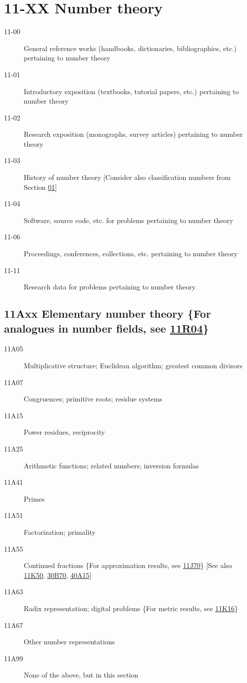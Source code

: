 \section*{11-XX Number theory }\label{11-XX}
\begin{description}
\item [11-00]\label{11-00} General reference works (handbooks, dictionaries, bibliographies, etc.) pertaining to number theory
\item [11-01]\label{11-01} Introductory exposition (textbooks, tutorial papers, etc.) pertaining to number theory
\item [11-02]\label{11-02} Research exposition (monographs, survey articles) pertaining to number theory
\item [11-03]\label{11-03} History of number theory [Consider also classification numbers from Section \hyperref[01-XX]{01}]
\item [11-04]\label{11-04} Software, source code, etc. for problems pertaining to number theory
\item [11-06]\label{11-06} Proceedings, conferences, collections, etc. pertaining to number theory
\item [11-11]\label{11-11} Research data for problems pertaining to number theory
\end{description}
\subsection*{11Axx  Elementary number theory \{For analogues in number fields, see \hyperref[11R04]{11R04}\} }\label{11Axx}
\begin{description} 
\item [11A05]\label{11A05} Multiplicative structure; Euclidean algorithm; greatest common divisors
\item [11A07]\label{11A07} Congruences; primitive roots; residue systems
\item [11A15]\label{11A15} Power residues, reciprocity
\item [11A25]\label{11A25} Arithmetic functions; related numbers; inversion formulas
\item [11A41]\label{11A41} Primes
\item [11A51]\label{11A51} Factorization; primality
\item [11A55]\label{11A55} Continued fractions \{For approximation results, see \hyperref[11J70]{11J70}\} [See also \hyperref[11K50]{11K50}, \hyperref[30B70]{30B70}, \hyperref[40A15]{40A15}]
\item [11A63]\label{11A63} Radix representation; digital problems \{For metric results, see \hyperref[11K16]{11K16}\}
\item [11A67]\label{11A67} Other number representations 
\item [11A99]\label{11A99} None of the above, but in this section
\end{description}
